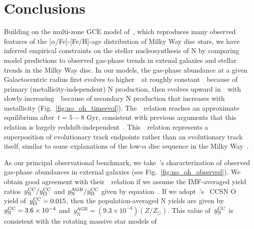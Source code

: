 \documentclass[ms.tex]{subfiles}
\begin{document}
\section{Conclusions}
\label{sec:conclusions}

Building on the multi-zone GCE model of~\citet{Johnson2021}, which reproduces
many observed features of the [$\alpha$/Fe]-[Fe/H]-age distribution of Milky
Way disc stars, we have inferred empirical constraints on the stellar
nucleosynthesis of N by comparing model predictions to observed gas-phase trends
in extenal galaxies and stellar trends in the Milky Way disc.
In our models, the gas-phase abundance at a given Galactocentric radius first
evolves to higher~\oh~at roughly constant~\no~because of primary
(metallicity-independent) N production, then evolves upward in~\no~with slowly
increasing~\oh~because of secondary N production that increases with
metallicity (Fig.~\ref{fig:no_oh_timeevol}).
The~\ohno~relation reaches an approximate equilibrium after~$t = 5 - 8$ Gyr,
consistent with previous arguments that this relation is largely
redshift-independent~\citep{Vincenzo2018, HaydenPawson2021}.
This~\ohno~relation represents a superposition of evolutionary track endpoints
rather than an evolutionary track itself, similar to some explanations of the
low-$\alpha$ disc sequence in the Milky Way~\citep[e.g.][]{Schoenrich2009,
Nidever2014, Buck2020, Sharma2021, Johnson2021}.
\par
As our principal observational benchmark, we take~\citeauthor{Dopita2016}'s
\citeyearpar{Dopita2016} characterization of observed gas-phase abundances
in external galaxies (see Fig.~\ref{fig:no_oh_observed}).
We obtain good agreement with their~\ohno~relation if we assume the
IMF-averaged yield ratios~$y_\text{N}^\text{CC} / y_\text{O}^\text{CC}$ and
$y_\text{N}^\text{AGB} / y_\text{O}^\text{CC}$ given by
equation~.
If we adopt~\citeauthor{Johnson2021}'s~\citeyearpar{Johnson2021} CCSN O yield
of~$y_\text{O}^\text{CC} = 0.015$, then the population-averaged N yields are given by
$y_\text{N}^\text{CC} = 3.6\times10^{-4}$
and~$y_\text{N}^\text{AGB} = (9.3\times10^{-4}) (Z / Z_\odot)$.
This value of~$y_\text{N}^\text{CC}$ is consistent with the rotating massive star models of
\end{document}
